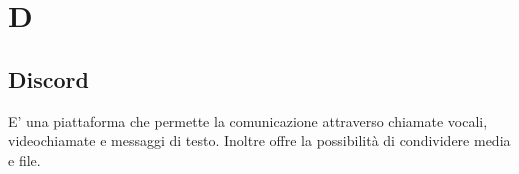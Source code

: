 \section{D}
\subsection{Discord}
E' una piattaforma che permette la comunicazione attraverso chiamate vocali, videochiamate e messaggi di testo.  Inoltre offre la possibilità di condividere media e file.
\clearpage